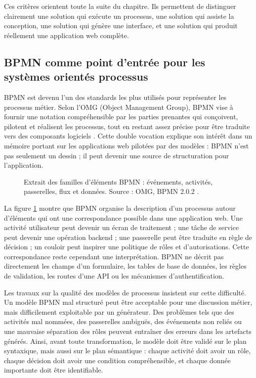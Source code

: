Ces critères orientent toute la suite du chapitre. Ils permettent de
distinguer clairement une solution qui exécute un processus, une
solution qui assiste la conception, une solution qui génère une
interface, et une solution qui produit réellement une application web
complète.


\subsection{BPMN comme point d'entrée pour les systèmes orientés processus}

BPMN est devenu l'un des standards les plus utilisés pour représenter
les processus métier. Selon l'OMG (Object Management Group), BPMN vise à
fournir une notation compréhensible par les parties prenantes qui
conçoivent, pilotent et réalisent les processus, tout en restant assez
précise pour être traduite vers des composants logiciels \cite{omg2013bpmn}. Cette
double vocation explique son intérêt dans un mémoire portant sur les
applications web pilotées par des modèles : BPMN n'est pas seulement un
dessin ; il peut devenir une source de structuration pour l'application.

\begin{figure}[H]
\centering
{}
\caption{Extrait des familles d'éléments BPMN : événements, activités,
passerelles, flux et données. Source : OMG, BPMN 2.0.2 \cite{omg2013bpmn}.}
\label{fig:elements-bpmn}
\end{figure}

La figure \ref{fig:elements-bpmn} montre que BPMN organise la description d'un processus
autour d'éléments qui ont une correspondance possible dans une
application web. Une activité utilisateur peut devenir un écran de
traitement ; une tâche de service peut devenir une opération backend ;
une passerelle peut être traduite en règle de décision ; un couloir peut
inspirer une politique de rôles et d'autorisations. Cette correspondance
reste cependant une interprétation. BPMN ne décrit pas directement les
champs d'un formulaire, les tables de base de données, les règles de
validation, les routes d'une API ou les mécanismes d'authentification.

Les travaux sur la qualité des modèles de processus insistent sur cette
difficulté. Un modèle BPMN mal structuré peut être acceptable pour une
discussion métier, mais difficilement exploitable par un générateur. Des
problèmes tels que des activités mal nommées, des passerelles ambiguës,
des événements non reliés ou une mauvaise séparation des rôles peuvent
entraîner des erreurs dans les artefacts générés. Ainsi, avant toute
transformation, le modèle doit être validé sur le plan syntaxique, mais
aussi sur le plan sémantique : chaque activité doit avoir un rôle,
chaque décision doit avoir une condition compréhensible, et chaque
donnée importante doit être identifiable.

